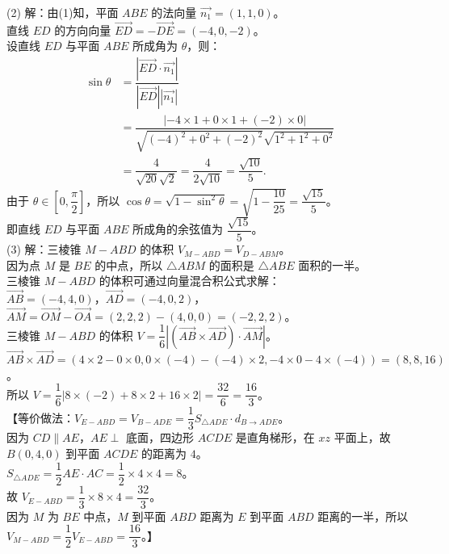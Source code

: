 {  (2) 解：由(1)知，平面 \(ABE\) 的法向量 \(\vec{n_1} = (1,1,0)\)。\\
  直线 \(ED\) 的方向向量 \(\vec{ED} = -\vec{DE} = (-4,0,-2)\)。\\
  设直线 \(ED\) 与平面 \(ABE\) 所成角为 \(\theta\)，则：\\
  \[
  \begin{aligned}
  \sin\theta
  &= \dfrac{|\vec{ED} \cdot \vec{n_1}|}{|\vec{ED}| |\vec{n_1}|} \\
  &= \dfrac{|-4 \times 1 + 0 \times 1 + (-2) \times 0|}
  {\sqrt{(-4)^2+0^2+(-2)^2}\sqrt{1^2+1^2+0^2}} \\
  &= \dfrac{4}{\sqrt{20}\sqrt{2}}
  = \dfrac{4}{2\sqrt{10}}
  = \dfrac{\sqrt{10}}{5}.
  \end{aligned}
  \]
  由于 \(\theta \in \left[0, \dfrac{\pi}{2}\right]\)，所以 \(\cos\theta = \sqrt{1 - \sin^2\theta} = \sqrt{1 - \dfrac{10}{25}} = \dfrac{\sqrt{15}}{5}\)。\\
  即直线 \(ED\) 与平面 \(ABE\) 所成角的余弦值为 \(\dfrac{\sqrt{15}}{5}\)。\\
  
  (3) 解：三棱锥 \(M - ABD\) 的体积 \(V_{M-ABD} = V_{D-ABM}\)。\\
  因为点 \(M\) 是 \(BE\) 的中点，所以 \(\triangle ABM\) 的面积是 \(\triangle ABE\) 面积的一半。\\
  三棱锥 \(M-ABD\) 的体积可通过向量混合积公式求解：\\
  \(\vec{AB} = (-4,4,0)\)，\(\vec{AD} = (-4,0,2)\)，\(\vec{AM} = \vec{OM} - \vec{OA} = (2,2,2) - (4,0,0) = (-2,2,2)\)。\\
  三棱锥 \(M-ABD\) 的体积 \(V = \dfrac{1}{6} \left| (\vec{AB} \times \vec{AD}) \cdot \vec{AM} \right|\)。\\
  \(\vec{AB} \times \vec{AD} = (4 \times 2 - 0 \times 0, 0 \times (-4) - (-4) \times 2, -4 \times 0 - 4 \times (-4)) = (8, 8, 16)\)。\\
  所以 \(V = \dfrac{1}{6} |8 \times (-2) + 8 \times 2 + 16 \times 2| = \dfrac{32}{6} = \dfrac{16}{3}\)。\\
  【等价做法：\(V_{E-ABD} = V_{B-ADE} = \dfrac{1}{3} S_{\triangle ADE} \cdot d_{B \to ADE}\)。\\
  因为 \(CD \parallel AE\)，\(AE \perp\) 底面，四边形 \(ACDE\) 是直角梯形，在 \(xz\) 平面上，故 \(B(0,4,0)\) 到平面 \(ACDE\) 的距离为 \(4\)。\\
  \(S_{\triangle ADE} = \dfrac{1}{2} AE \cdot AC = \dfrac{1}{2} \times 4 \times 4 = 8\)。\\
  故 \(V_{E-ABD} = \dfrac{1}{3} \times 8 \times 4 = \dfrac{32}{3}\)。\\
  因为 \(M\) 为 \(BE\) 中点，\(M\) 到平面 \(ABD\) 距离为 \(E\) 到平面 \(ABD\) 距离的一半，所以 \(V_{M-ABD} = \dfrac{1}{2} V_{E-ABD} = \dfrac{16}{3}\)。】%
}

